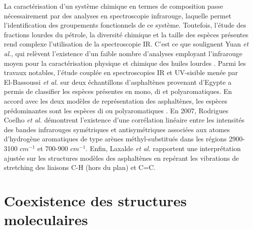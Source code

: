 	La caractérisation d'un système chimique en termes de composition passe nécessairement par des analyses en spectroscopie infrarouge, laquelle permet l'identification des groupements fonctionnels de ce système. Toutefois, l'étude des fractions lourdes du pétrole, la diversité chimique et la taille des espèces présentes rend complexe l'utilisation de la spectroscopie IR. C'est ce que soulignent Yuan \textit{et al.}, qui relèvent l'existence d'un faible nombre d'analyses employant l'infrarouge moyen pour la caractérisation physique et chimique des huiles lourdes \cite{hongfu2006determination}. 
	Parmi les travaux notables, l'étude couplée en spectroscopies IR et UV-sisible menée par El-Bassoussi \textit{et al.} sur deux échantillons d'asphaltènes provenant d'Egypte a permis de classifier les espèces présentes en mono, di et polyaromatiques. En accord avec les deux modèles de représentation des asphaltènes, les espèces prédominantes sont les espèces di ou polyaromatiques \cite{el2010characterization}. En 2007, Rodrigues Coelho \textit{et al.} \cite{coelho2007characterization} démontrent l'existence d'une corrélation linéaire entre les intensités des bandes infrarouges symétriques et antisymétriques associées aux atomes d'hydrogène aromatiques de type arènes méthyl-substitués dans les régions 2900-3100 $cm^{-1}$ et 700-900 $cm^{-1}$. Enfin, Laxalde \textit{et al.} \cite{laxalde2014combining} rapportent une interprétation ajustée sur les structures modèles des asphaltènes en repérant les vibrations de stretching des liaisons C-H (hors du plan) et C=C.
	
	\bigskip
	
	\section{Coexistence des structures moleculaires}
	
